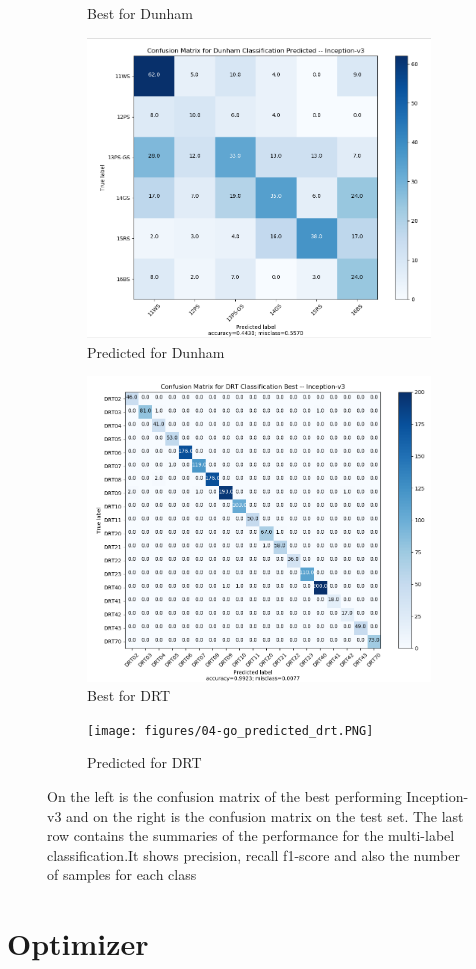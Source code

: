 \begin{figure}
\begin{subfigure}{.5\textwidth}
  \caption{Best for Dunham}
  \label{fig:rescm_dunham}
\end{subfigure}%
\begin{subfigure}{.5\textwidth}
  \centering
  \includegraphics[width=.8\linewidth]{figures/04-go_dunham_pred.PNG}
  \caption{Predicted for Dunham}
  \label{fig:rescmpred_dunham}
\end{subfigure}
\begin{subfigure}{.5\textwidth}
  \centering
  \includegraphics[width=.8\linewidth]{figures/04-go_drt_best.PNG}
  \caption{Best for DRT}
  \label{fig:rescm_drt}
\end{subfigure}%
\begin{subfigure}{.5\textwidth}
  \centering
  \texttt{[image: figures/04-go\_predicted\_drt.PNG]}
  \caption{Predicted for DRT}
  \label{fig:rescmpred_drt}
\end{subfigure}
\caption[Confusion matrices of classes trained on Inception-v3]{On the left is the confusion matrix of the best performing Inception-v3 and on the right is the confusion matrix on the test set. The last row contains the summaries of the performance for the multi-label classification.It shows precision, recall f1-score and also the number of samples for each class}
\label{fig:googcm}
\end{figure}
\fi
\section{Optimizer}